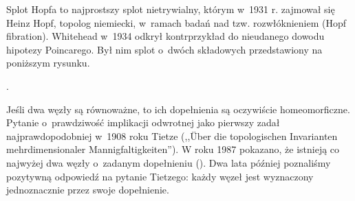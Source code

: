 \begin{example}
    Splot Hopfa to najprostszy splot nietrywialny, którym w~1931 r. zajmował się Heinz Hopf, topolog niemiecki, w~ramach badań nad tzw. rozwłóknieniem (Hopf fibration).
    Whitehead w~1934 odkrył kontrprzykład do nieudanego dowodu hipotezy Poincarego.
    Był nim splot o~dwóch składowych przedstawiony na poniższym rysunku.

    .
\end{example}

Jeśli dwa węzły są równoważne, to ich dopełnienia są oczywiście homeomorficzne.
Pytanie o~prawdziwość implikacji odwrotnej jako pierwszy zadał najprawdopodobniej w~1908 roku Tietze (,,Über die topologischen Invarianten mehrdimensionaler Mannigfaltigkeiten'').
W roku 1987 pokazano, że istnieją co najwyżej dwa węzły o~zadanym dopełnieniu (\cite{culler87}).
Dwa lata później poznaliśmy pozytywną odpowiedź na pytanie Tietzego: każdy węzeł jest wyznaczony jednoznacznie przez swoje dopełnienie.

